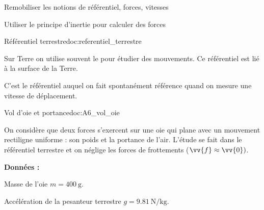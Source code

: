 \teteSndMouv




\begin{objectifs}
  \item Remobiliser les notions de référentiel, forces, vitesses
  \item Utiliser le principe d'inertie pour calculer des forces
\end{objectifs}


\begin{doc}{Référentiel terrestre}{doc:referentiel_terrestre}
  \begin{encart}
    Sur Terre on utilise souvent le  pour étudier des mouvements. Ce référentiel est lié à la surface de la Terre.
  \end{encart}
  C'est le référentiel auquel on fait spontanément référence quand on mesure une vitesse de déplacement.
\end{doc}



\begin{doc}{Vol d'oie et portance}{doc:A6_vol_oie}
  \begin{center}
  \end{center}
  
  
  On considère que deux forces s'exercent sur une oie qui plane avec un mouvement rectiligne uniforme : son poids et la portance de l'air.
  L'étude se fait dans le référentiel terrestre et on néglige les forces de frottements ($\vv{f} \approx \vv{0})$.

  \textbf{Données :}
  \begin{listePoints}
    \item Masse de l'oie $m = \qty{400}{\g}$.
    \item Accélération de la pesanteur terrestre $g = \qty{9,81}{\newton \per\kg}$.
  \end{listePoints}
\end{doc}





